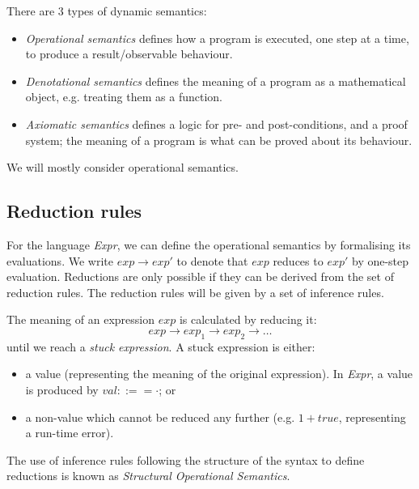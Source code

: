 \documentclass[a4paper, openany]{memoir}
\begin{document}
    There are 3 types of dynamic semantics:
    \begin{itemize}
        \item \emph{Operational semantics} defines how a program is executed, one step at a time, to produce a result/observable behaviour.
        \item \emph{Denotational semantics} defines the meaning of a program as a mathematical object, e.g. treating them as a function.
        \item \emph{Axiomatic semantics} defines a logic for pre- and post-conditions, and a proof system; the meaning of a program is what can be proved about its behaviour.
    \end{itemize}
    We will mostly consider operational semantics.

    \subsection{Reduction rules}
    For the language \textit{Expr}, we can define the operational semantics by formalising its evaluations. We write $exp \to exp'$ to denote that $exp$ reduces to $exp'$ by one-step evaluation. Reductions are only possible if they can be derived from the set of reduction rules. The reduction rules will be given by a set of inference rules.

    The meaning of an expression $exp$ is calculated by reducing it:
    \[exp \to exp_1 \to exp_2 \to \dots\]
    until we reach a \emph{stuck expression}. A stuck expression is either:
    \begin{itemize}
        \item a value (representing the meaning of the original expression). In \textit{Expr}, a value is produced by $val ::== \cdot$; or
        \item a non-value which cannot be reduced any further (e.g. $1 + \textit{true}$, representing a run-time error).
    \end{itemize}
    The use of inference rules following the structure of the syntax to define reductions is known as \emph{Structural Operational Semantics}.
\end{document}
